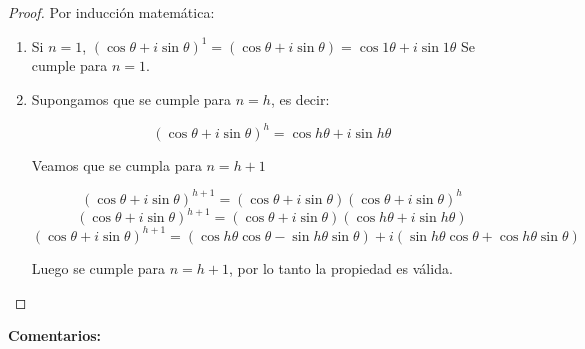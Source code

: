 \documentclass[a4paper,12pt]{article}
\begin{document}
\begin{proof}
    Por inducción matemática:
    
    \begin{enumerate}
        \item Si $n = 1$, $(\cos \theta + i \sin \theta)^1 = (\cos \theta + i \sin \theta) = \cos 1\theta + i \sin 1\theta$
        \newline
        Se cumple para $n = 1$.
        \item Supongamos que se cumple para $n = h$, es decir:
        
        \[
        (\cos \theta + i \sin \theta)^h = \cos h\theta + i \sin h\theta
        \]
        
        Veamos que se cumpla para $n = h+1$
        
        \[
        (\cos \theta + i \sin \theta)^{h+1} = (\cos \theta + i \sin \theta)(\cos \theta + i \sin \theta)^h
        \]
        \[
        (\cos \theta + i \sin \theta)^{h+1}= (\cos \theta + i \sin \theta)(\cos h\theta + i \sin h\theta)
        \]
        \[
        (\cos \theta + i \sin \theta)^{h+1}= (\cos h\theta \cos \theta - \sin h\theta \sin \theta) + i (\sin h\theta \cos \theta + \cos h\theta \sin \theta)
        \]
        
        Luego se cumple para $n = h+1$, por lo tanto la propiedad es válida.
    \end{enumerate}
\end{proof}


\textbf{Comentarios:}
\end{document}

